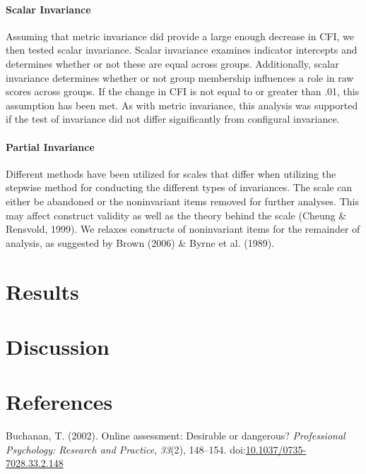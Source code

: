 \documentclass[english,man]{apa6}
\begin{document}
\paragraph{Scalar Invariance}\label{scalar-invariance}

Assuming that metric invariance did provide a large enough decrease in
CFI, we then tested scalar invariance. Scalar invariance examines
indicator intercepts and determines whether or not these are equal
across groups. Additionally, scalar invariance determines whether or not
group membership influences a role in raw scores across groups. If the
change in CFI is not equal to or greater than .01, this assumption has
been met. As with metric invariance, this analysis was supported if the
test of invariance did not differ significantly from configural
invariance.

\paragraph{Partial Invariance}\label{partial-invariance}

Different methods have been utilized for scales that differ when
utilizing the stepwise method for conducting the different types of
invariances. The scale can either be abandoned or the noninvariant items
removed for further analyses. This may affect construct validity as well
as the theory behind the scale (Cheung \& Rensvold, 1999). We relaxes
constructs of noninvariant items for the remainder of analysis, as
suggested by Brown (2006) \& Byrne et al. (1989).

\section{Results}\label{results}

\section{Discussion}\label{discussion}

\newpage

\section{References}\label{references}

\setlength{\parindent}{-0.5in} \setlength{\leftskip}{0.5in}

\hypertarget{refs}{}
\hypertarget{ref-Buchanan2002}{}
Buchanan, T. (2002). Online assessment: Desirable or dangerous?
\emph{Professional Psychology: Research and Practice}, \emph{33}(2),
148--154.
doi:\href{https://doi.org/10.1037/0735-7028.33.2.148}{10.1037/0735-7028.33.2.148}
\end{document}
